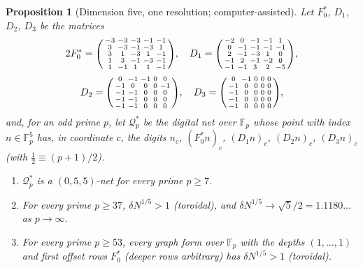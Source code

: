 \documentclass[11pt]{amsart}
\newtheorem{proposition}[theorem]{Proposition}
\theoremstyle{definition}
\theoremstyle{plain}
\newcommand{\F}{\mathbb{F}}
\begin{document}
\begin{proposition}[Dimension five, one resolution; computer-assisted]\label{prop:half5}
Let $F_0^*$, $D_1$, $D_2$, $D_3$ be the matrices
\[
2F_0^*=\begin{psmallmatrix}-3&-3&-3&-1&-1\\3&-3&-1&-3&1\\3&1&-3&1&-1\\1&3&-1&-3&-1\\1&-1&1&1&-1\end{psmallmatrix},\quad
D_1=\begin{psmallmatrix}-2&0&-1&-1&1\\0&-1&-1&-1&-1\\2&-1&-3&1&0\\-1&2&-1&-2&0\\-1&-1&3&2&-5\end{psmallmatrix},
\]
\[
D_2=\begin{psmallmatrix}0&-1&-1&0&0\\-1&0&0&0&-1\\-1&-1&0&0&0\\-1&-1&0&0&0\\-1&-1&0&0&0\end{psmallmatrix},\quad
D_3=\begin{psmallmatrix}0&-1&0&0&0\\-1&0&0&0&0\\-1&0&0&0&0\\-1&0&0&0&0\\-1&0&0&0&0\end{psmallmatrix},
\]
and, for an odd prime $p$, let $\mathcal Q^*_p$ be the digital net over $\F_p$ whose point with index $n\in\F_p^5$ has, in coordinate $c$, the digits $n_c$, $(F_0^*n)_c$, $(D_1n)_c$, $(D_2n)_c$, $(D_3n)_c$ (with $\frac12\equiv(p+1)/2$).
\begin{enumerate}
\item $\mathcal Q^*_p$ is a $(0,5,5)$-net for every prime $p\ge7$.
\item For every prime $p\ge37$, $\delta N^{1/5}>1$ (toroidal), and $\delta N^{1/5}\to\sqrt5/2=1.1180\ldots$ as $p\to\infty$.
\item For every prime $p\ge53$, every graph form over $\F_p$ with the depths $(1,\dots,1)$ and first offset rows $F_0^*$ (deeper rows arbitrary) has $\delta N^{1/5}>1$ (toroidal).
\end{enumerate}
\end{proposition}
\end{document}
